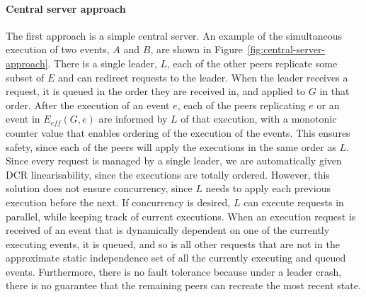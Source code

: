 \documentclass{article}
\begin{document}
	\paragraph{Central server approach}
	The first approach is a simple central server.
    An example of the simultaneous execution of two events, $A$ and $B$, are shown in Figure~\ref{fig:central-server-approach}.
	There is a single leader, $L$, each of the other peers replicate some subset of $E$ and can redirect requests to the leader.
	When the leader receives a request, it is queued in the order they are received in, and applied to $G$ in that order.
	After the execution of an event $e$, each of the peers replicating $e$ or an event in $E_{eff}(G,e)$ are informed by $L$ of that execution, with a monotonic counter value that enables ordering of the execution of the events.
	This ensures safety, since each of the peers will apply the executions in the same order as $L$.
	Since every request is managed by a single leader, we are automatically given DCR linearisability, since the executions are totally ordered.
	However, this solution does not ensure concurrency, since $L$ needs to apply each previous execution before the next.
	If concurrency is desired, $L$ can execute requests in parallel, while keeping track of current executions.
	When an execution request is received of an event that is dynamically dependent on one of the currently executing events, it is queued, and so is all other requests that are not in the approximate static independence set of all the currently executing and queued events.
	Furthermore, there is no fault tolerance because under a leader crash, there is no guarantee that the remaining peers can recreate the most recent state.
\end{document}
